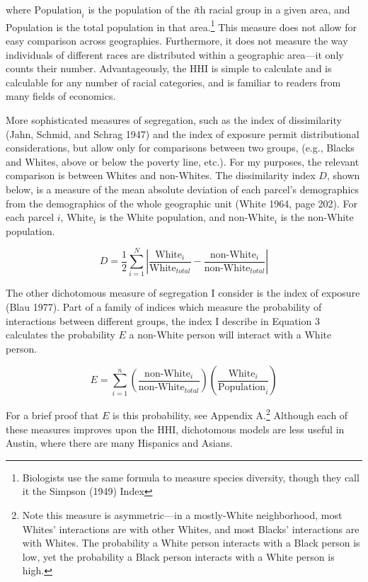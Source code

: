 \documentclass[11pt]{article}
\begin{document}
\noindent where $\text{Population}_i$ is the population of the \textit{i}th racial group in a given area, and Population is the total population in that area.\footnote{Biologists use the same formula to measure species diversity, though they call it the Simpson (1949) Index} This measure does not allow for easy comparison across geographies. Furthermore, it does not measure the way individuals of different races are distributed within a geographic area---it only counts their number. Advantageously, the HHI is simple to calculate and is calculable for any number of racial categories, and is familiar to readers from many fields of economics.

More sophisticated measures of segregation, such as the index of dissimilarity (Jahn, Schmid, and Schrag 1947) and the index of exposure permit distributional considerations, but allow only for comparisons between two groups, (e.g., Blacks and Whites, above or below the poverty line, etc.). For my purposes, the relevant comparison is between Whites and non-Whites. The dissimilarity index $D$, shown below, is a measure of the mean absolute deviation of each parcel's demographics from the demographics of the whole geographic unit (White 1964, page 202). For each parcel $i$, $\text{White}_i$ is the White population, and $\text{non-White}_i$ is the non-White population.

\begin{equation}
    D=\frac{1}{2}\sum_{i=1}^N\left|\frac{\text{White}_i}{\text{White}_{total}}-\frac{\text{non-White}_i}{\text{non-White}_{total}}\right|
\end{equation}

\noindent The other dichotomous measure of segregation I consider is the index of exposure (Blau 1977). Part of a family of indices which measure the probability of interactions between different groups, the index I describe in Equation 3 calculates the probability $E$ a non-White person will interact with a White person.

\begin{equation}
    E=\sum_{i=1}^n\left(\frac{\text{non-White}_i}{\text{non-White}_{total}}\right)\left(\frac{\text{White}_i}{\text{Population}_{i}}\right)
\end{equation}

\noindent For a brief proof that $E$ is this probability, see Appendix A.\footnote{Note this measure is asymmetric---in a mostly-White neighborhood, most Whites' interactions are with other Whites, and most Blacks' interactions are with Whites. The probability a White person interacts with a Black person is low, yet the probability a Black person interacts with a White person is high.} Although each of these measures improves upon the HHI, dichotomous models are less useful in Austin, where there are many Hispanics and Asians.
\end{document}
